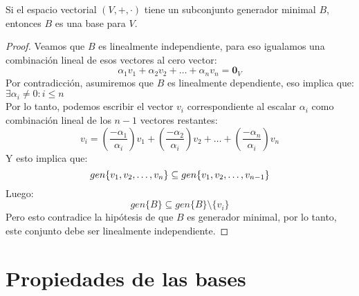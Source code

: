 \begin{theorem}
Si el espacio vectorial $(V , + , \cdot)$ tiene un subconjunto generador minimal $B$, entonces $B$ es una base para $V$.
\end{theorem}
\begin{proof}
Veamos que $B$ es linealmente independiente, para eso igualamos una combinación lineal de esos vectores al cero vector:
$$\alpha_1 v_1 + \alpha_2  v_2 + \hdots + \alpha_n v_n = \mathbf{0}_V $$
Por contradicción, asumiremos que $B$ es linealmente dependiente, eso implica que: $\exists \alpha_i \neq 0: i \leq n$\\
Por lo tanto, podemos escribir el vector $v_i$ correspondiente al escalar $\alpha_i$ como combinación lineal de los $n-1$ vectores restantes:
$$v_i = \left( \frac{-\alpha_1}{\alpha_i} \right)v_1 + \left( \frac{-\alpha_2}{\alpha_i} \right)v_2 + \hdots + \left( \frac{-\alpha_n}{\alpha_i} \right)v_n$$
Y esto implica que: 
$$gen \lbrace v_1, v_2, \ldots, v_n \rbrace \subseteq gen \lbrace v_1, v_2, \ldots, v_{n-1} \rbrace$$
Luego:
$$gen\{B\} \subseteq gen\{B\} \setminus \{v_i\}$$
Pero esto contradice la hipótesis de que $B$ es generador minimal, por lo tanto, este conjunto debe ser linealmente independiente.

\end{proof}


\section{Propiedades de las bases}
%


%
%

